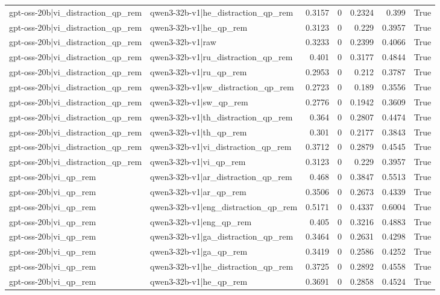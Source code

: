 \begin{table}
\begin{tabular}{l l r r r r l}
gpt-oss-20b|vi_distraction_qp_rem & qwen3-32b-v1|he_distraction_qp_rem & 0.3157 & 0 & 0.2324 & 0.399 & True \\
gpt-oss-20b|vi_distraction_qp_rem & qwen3-32b-v1|he_qp_rem & 0.3123 & 0 & 0.229 & 0.3957 & True \\
gpt-oss-20b|vi_distraction_qp_rem & qwen3-32b-v1|raw & 0.3233 & 0 & 0.2399 & 0.4066 & True \\
gpt-oss-20b|vi_distraction_qp_rem & qwen3-32b-v1|ru_distraction_qp_rem & 0.401 & 0 & 0.3177 & 0.4844 & True \\
gpt-oss-20b|vi_distraction_qp_rem & qwen3-32b-v1|ru_qp_rem & 0.2953 & 0 & 0.212 & 0.3787 & True \\
gpt-oss-20b|vi_distraction_qp_rem & qwen3-32b-v1|sw_distraction_qp_rem & 0.2723 & 0 & 0.189 & 0.3556 & True \\
gpt-oss-20b|vi_distraction_qp_rem & qwen3-32b-v1|sw_qp_rem & 0.2776 & 0 & 0.1942 & 0.3609 & True \\
gpt-oss-20b|vi_distraction_qp_rem & qwen3-32b-v1|th_distraction_qp_rem & 0.364 & 0 & 0.2807 & 0.4474 & True \\
gpt-oss-20b|vi_distraction_qp_rem & qwen3-32b-v1|th_qp_rem & 0.301 & 0 & 0.2177 & 0.3843 & True \\
gpt-oss-20b|vi_distraction_qp_rem & qwen3-32b-v1|vi_distraction_qp_rem & 0.3712 & 0 & 0.2879 & 0.4545 & True \\
gpt-oss-20b|vi_distraction_qp_rem & qwen3-32b-v1|vi_qp_rem & 0.3123 & 0 & 0.229 & 0.3957 & True \\
gpt-oss-20b|vi_qp_rem & qwen3-32b-v1|ar_distraction_qp_rem & 0.468 & 0 & 0.3847 & 0.5513 & True \\
gpt-oss-20b|vi_qp_rem & qwen3-32b-v1|ar_qp_rem & 0.3506 & 0 & 0.2673 & 0.4339 & True \\
gpt-oss-20b|vi_qp_rem & qwen3-32b-v1|eng_distraction_qp_rem & 0.5171 & 0 & 0.4337 & 0.6004 & True \\
gpt-oss-20b|vi_qp_rem & qwen3-32b-v1|eng_qp_rem & 0.405 & 0 & 0.3216 & 0.4883 & True \\
gpt-oss-20b|vi_qp_rem & qwen3-32b-v1|ga_distraction_qp_rem & 0.3464 & 0 & 0.2631 & 0.4298 & True \\
gpt-oss-20b|vi_qp_rem & qwen3-32b-v1|ga_qp_rem & 0.3419 & 0 & 0.2586 & 0.4252 & True \\
gpt-oss-20b|vi_qp_rem & qwen3-32b-v1|he_distraction_qp_rem & 0.3725 & 0 & 0.2892 & 0.4558 & True \\
gpt-oss-20b|vi_qp_rem & qwen3-32b-v1|he_qp_rem & 0.3691 & 0 & 0.2858 & 0.4524 & True \\

\end{tabular}
\end{table}
